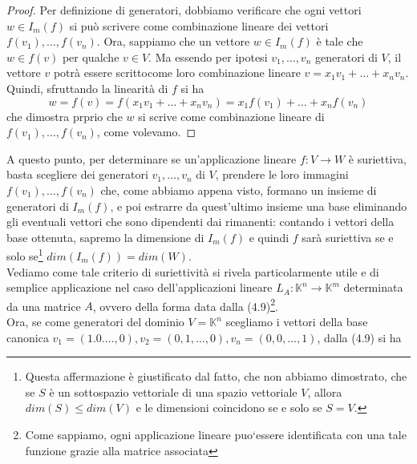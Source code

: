\documentclass{book}
\begin{document}
\begin{proof}
  Per definizione di generatori, dobbiamo verificare che ogni vettori $w\in I_m(f)$ si può scrivere come
  combinazione lineare dei vettori $f(v_1),\dots,f(v_n)$. Ora, sappiamo che un vettore $w\in I_m(f)$ è tale che
  $w\in f(v)$ per qualche $v\in V$. Ma essendo per ipotesi $v_1,\dots,v_n$ generatori di $V$, il vettore
  $v$ potrà essere scrittocome loro combinazione lineare $v=x_1v_1+\dots+x_nv_n$. Quindi, sfruttando la
  linearità di $f$ si ha
  \begin{equation*}
    w=f(v)=f(x_1v_1+\dots+x_nv_n)=x_1f(v_1)+\dots+x_nf(v_n)
  \end{equation*}
  che dimostra prprio che $w$ si scrive come combinazione lineare di $f(v_1),\dots,f(v_n)$, come volevamo.
\end{proof}
A questo punto, per determinare se un'applicazione lineare $f:V\to W$ è suriettiva, basta scegliere dei
generatori $v_1,\dots,v_n$ di $V$, prendere le loro immagini $f(v_1),\dots,f(v_n)$ che, come abbiamo appena
visto, formano un insieme di generatori di $I_m(f)$, e poi estrarre da quest'ultimo insieme una base eliminando
gli eventuali vettori che sono dipendenti dai rimanenti: contando i vettori della base ottenuta, sapremo la
dimensione di $I_m(f)$ e quindi $f$ sarà suriettiva se e solo se\footnote{Questa affermazione è giustificato
  dal fatto, che non abbiamo dimostrato, che se $S$ è un sottospazio vettoriale di una spazio vettoriale $V$,
  allora $dim (S)\leq dim (V)$ e le dimensioni coincidono se e solo se $S=V$.} $dim(I_m(f))=dim(W)$.\\
Vediamo come tale criterio di suriettività si rivela particolarmente utile e di semplice applicazione nel caso
dell'applicazioni lineare $L_A:\mathds{K}^n\to \mathds{K}^m$ determinata da una matrice $A$, ovvero della forma
data dalla (4.9)\footnote{Come sappiamo, ogni applicazione lineare puo`essere identificata con una tale
  funzione grazie alla matrice associata}.\\
Ora, se come generatori del dominio $V=\mathds{K}^n$ scegliamo i vettori della base canonica
$v_1=(1.0.\dots,0),v_2=(0,1,\dots,0),v_n=(0,0,\dots,1)$, dalla (4.9) si ha
\end{document}
